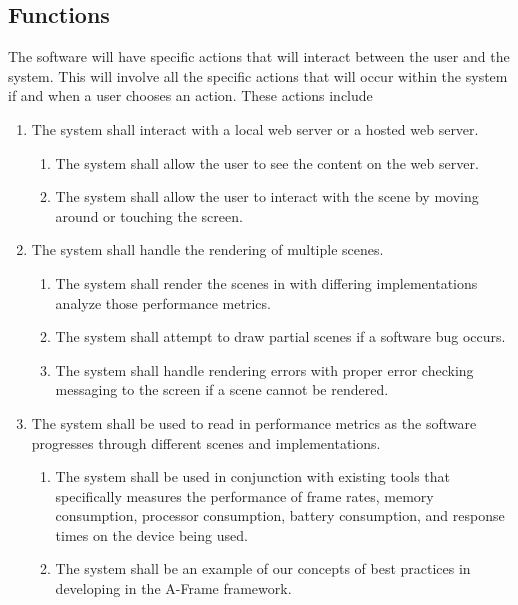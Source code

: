 \documentclass[letterpaper,10pt,titlepage,draftclsnofoot,onecolumn,compsoc,utf8,latin1]{IEEEtran}
\begin{document}
\begin{singlespace}
\begin{singlespace}
\end{singlespace}

\subsection{Functions}
\begin{singlespace}
\noindent
The software will have specific actions that will interact between the user and the system. This will involve all the specific actions that will occur within the system if and when a user chooses an action. These actions include \\
\end{singlespace}
\begin{enumerate}[labelsep=2em,leftmargin=.5in]
    \item The system shall interact with a local web server or a hosted web server. 
    \begin{enumerate}[leftmargin=*,labelindent=0pt]
        \item The system shall allow the user to see the content on the web server.
        \item The system shall allow the user to interact with the scene by moving around or touching the screen.
    \end{enumerate}
    \item The system shall handle the rendering of multiple scenes.
    \begin{enumerate}[leftmargin=*,labelindent=0pt]
        \item The system shall render the scenes in with differing implementations analyze those performance metrics.
        \item The system shall attempt to draw partial scenes if a software bug occurs.
        \item The system shall handle rendering errors with proper error checking messaging to the screen if a scene cannot be rendered.
    \end{enumerate}
    \item The system shall be used to read in performance metrics as the software progresses through different scenes and implementations.
    \begin{enumerate}[leftmargin=*,labelindent=0pt]
        \item The system shall be used in conjunction with existing tools that specifically measures the performance of frame rates, memory consumption, processor consumption, battery consumption, and response times on the device being used.
        \item The system shall be an example of our concepts of best practices in developing in the A-Frame framework.
    \end{enumerate}
\end{enumerate}


\end{singlespace}
\end{document}
